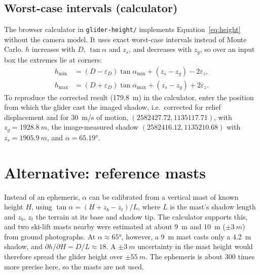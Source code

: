 \documentclass[11pt,a4paper]{article}
\newcommand{\code}[1]{\texttt{#1}}
\begin{document}
\subsection{Worst-case intervals (calculator)}

The browser calculator in \code{glider-height/} implements Equation~\eqref{eq:height} without the camera
model. It uses exact worst-case intervals instead of Monte Carlo. $h$ increases with $D$,
$\tan\alpha$ and $z_s$, and decreases with $z_g$, so over an input box the extremes lie at corners:
\begin{align}
  h_{\min} &= (D-\varepsilon_D)\tan\alpha_{\min} + (z_s - z_g) - 2\varepsilon_z,\\
  h_{\max} &= (D+\varepsilon_D)\tan\alpha_{\max} + (z_s - z_g) + 2\varepsilon_z.
\end{align}
To reproduce the corrected result (\SI{179.8}{m}) in the calculator, enter the position from which the glider
cast the imaged shadow, i.e.\ corrected for relief displacement and for \SI{30}{m/s} of motion,
$(\num{2582427.72}, \num{1135117.71})$, with $z_g = \SI{1928.8}{m}$, the image-measured shadow
$(\num{2582416.12}, \num{1135210.68})$ with $z_s = \SI{1905.9}{m}$, and $\alpha = \ang{65.19}$.

\section{Alternative: reference masts}\label{sec:masts}

Instead of an ephemeris, $\alpha$ can be calibrated from a vertical mast of known height $H$, using
$\tan\alpha = (H + z_b - z_t)/L$, where $L$ is the mast's shadow length and $z_b$, $z_t$ the terrain
at its base and shadow tip. The calculator supports this, and two ski-lift masts nearby were
estimated at about \SI{9}{m} and \SI{10}{m} ($\pm\SI{3}{m}$) from ground photographs. At $\alpha\approx\ang{65}$,
however, a \SI{9}{m} mast casts only a \SI{4.2}{m} shadow, and $\partial h/\partial H = D/L \approx 18$. A
$\pm\SI{3}{m}$ uncertainty in the mast height would therefore spread the glider height over
$\pm\SI{55}{m}$. The ephemeris is about 300 times more precise here, so the masts are not used.
\end{document}
